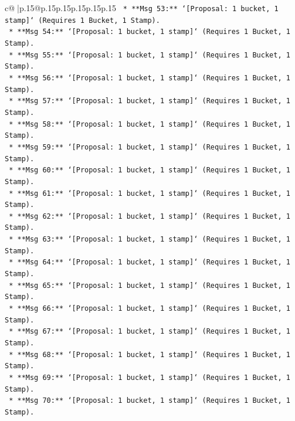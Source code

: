 \documentclass{article}
\begin{document}
{\begin{supertabular}{c@{$\;$}|p{.15\linewidth}@{}p{.15\linewidth}p{.15\linewidth}p{.15\linewidth}p{.15\linewidth}p{.15\linewidth}}
{{{\texttt{                *   **Msg 53:** `{[}Proposal: 1 bucket, 1 stamp{]}` (Requires 1 Bucket, 1 Stamp).} \\
\texttt{                *   **Msg 54:** `{[}Proposal: 1 bucket, 1 stamp{]}` (Requires 1 Bucket, 1 Stamp).} \\
\texttt{                *   **Msg 55:** `{[}Proposal: 1 bucket, 1 stamp{]}` (Requires 1 Bucket, 1 Stamp).} \\
\texttt{                *   **Msg 56:** `{[}Proposal: 1 bucket, 1 stamp{]}` (Requires 1 Bucket, 1 Stamp).} \\
\texttt{                *   **Msg 57:** `{[}Proposal: 1 bucket, 1 stamp{]}` (Requires 1 Bucket, 1 Stamp).} \\
\texttt{                *   **Msg 58:** `{[}Proposal: 1 bucket, 1 stamp{]}` (Requires 1 Bucket, 1 Stamp).} \\
\texttt{                *   **Msg 59:** `{[}Proposal: 1 bucket, 1 stamp{]}` (Requires 1 Bucket, 1 Stamp).} \\
\texttt{                *   **Msg 60:** `{[}Proposal: 1 bucket, 1 stamp{]}` (Requires 1 Bucket, 1 Stamp).} \\
\texttt{                *   **Msg 61:** `{[}Proposal: 1 bucket, 1 stamp{]}` (Requires 1 Bucket, 1 Stamp).} \\
\texttt{                *   **Msg 62:** `{[}Proposal: 1 bucket, 1 stamp{]}` (Requires 1 Bucket, 1 Stamp).} \\
\texttt{                *   **Msg 63:** `{[}Proposal: 1 bucket, 1 stamp{]}` (Requires 1 Bucket, 1 Stamp).} \\
\texttt{                *   **Msg 64:** `{[}Proposal: 1 bucket, 1 stamp{]}` (Requires 1 Bucket, 1 Stamp).} \\
\texttt{                *   **Msg 65:** `{[}Proposal: 1 bucket, 1 stamp{]}` (Requires 1 Bucket, 1 Stamp).} \\
\texttt{                *   **Msg 66:** `{[}Proposal: 1 bucket, 1 stamp{]}` (Requires 1 Bucket, 1 Stamp).} \\
\texttt{                *   **Msg 67:** `{[}Proposal: 1 bucket, 1 stamp{]}` (Requires 1 Bucket, 1 Stamp).} \\
\texttt{                *   **Msg 68:** `{[}Proposal: 1 bucket, 1 stamp{]}` (Requires 1 Bucket, 1 Stamp).} \\
\texttt{                *   **Msg 69:** `{[}Proposal: 1 bucket, 1 stamp{]}` (Requires 1 Bucket, 1 Stamp).} \\
\texttt{                *   **Msg 70:** `{[}Proposal: 1 bucket, 1 stamp{]}` (Requires 1 Bucket, 1 Stamp).} \\
}}}
\end{supertabular}}
\end{document}
